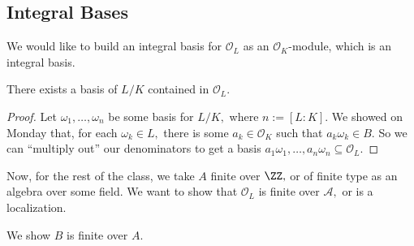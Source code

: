 \documentclass[../notes.tex]{subfiles}
\begin{document}
\subsection{Integral Bases}
We would like to build an integral basis for $\mathcal O_L$ as an $\mathcal O_K$-module, which is an integral basis.
\begin{lem}
    There exists a basis of $L/K$ contained in $\mathcal O_L.$
\end{lem}
\begin{proof}
    Let $\omega_1,\ldots,\omega_n$ be some basis for $L/K,$ where $n:=[L:K].$ We showed on Monday that, for each $\omega_k\in L,$ there is some $a_k\in\mathcal O_K$ such that $a_k\omega_k\in B.$ So we can ``multiply out'' our denominators to get a basis $a_1\omega_1,\ldots,a_n\omega_n\subseteq\mathcal O_L.$
\end{proof}
Now, for the rest of the class, we take $A$ finite over $\ZZ,$ or of finite type as an algebra over some field. We want to show that $\mathcal O_L$ is finite over $\mathcal A,$ or is a localization.
\begin{thm}
    We show $B$ is finite over $A.$
\end{thm}
\end{document}

